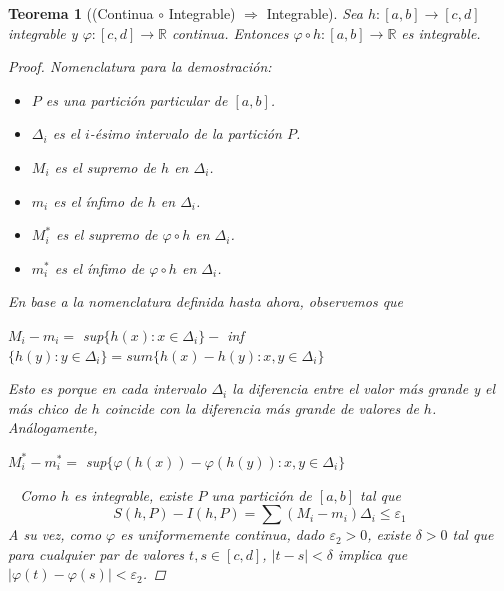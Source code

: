 \documentclass[]{article}
\newtheorem{teo}{Teorema}
\def\R{\mathbb{R}}
\def\e{\varepsilon}
\begin{document}
\begin{teo}[(Continua $\circ$ Integrable) $\Rightarrow$ Integrable]
	Sea $h:[a,b]\to[c,d]$ integrable y $\varphi:[c,d]\to\R$ continua. Entonces $\varphi \circ h:[a,b]\to\R$ es integrable.
	\begin{proof}
		Nomenclatura para la demostración:
		\begin{itemize}
			\item $P$ es una partición particular de $[a,b]$. 
			\item $\Delta_i$ es el $i$-ésimo intervalo de la partición $P$.
			\item $M_i$ es el supremo de $h$ en $\Delta_i$.
			\item $m_i$ es el ínfimo de $h$ en $\Delta_i$.
			\item $M^*_i$ es el supremo de $\varphi \circ h$ en $\Delta_i$.
			\item $m^*_i$ es el ínfimo de $\varphi \circ h$ en $\Delta_i$.
		\end{itemize}
		En base a la nomenclatura definida hasta ahora, observemos que 
		\begin{center}
			$M_i - m_i = $ sup$\{h(x):x\in\Delta_i\}-$ inf$\{h(y):y\in\Delta_i\} = sum\{h(x)-h(y):x,y\in\Delta_i\}$
		\end{center}
		Esto es porque en cada intervalo $\Delta_i$ la diferencia entre el valor más grande y el más chico de $h$ coincide con la diferencia más grande de valores de $h$.
		Análogamente,
		\begin{center}
			$M^*_i-m^*_i = $ sup$\{\varphi(h(x)) - \varphi(h(y)):x,y\in\Delta_i\}$
		\end{center}
		
		~\newline
		Como $h$ es integrable, existe $P$ una partición de $[a,b]$ tal que
		\begin{equation}\label{COSO}
			S(h,P)-I(h,P)=\sum(M_i - m_i)\Delta_i\leq\e_1
		\end{equation}
		A su vez, como $\varphi$ es uniformemente continua, dado $\e_2>0$, existe $\delta>0$ tal que para cualquier par de valores $t,s\in[c,d]$, $|t-s|<\delta$ implica que $|\varphi(t) - \varphi(s)| < \e_2$.
		

\end{proof}
\end{teo}
\end{document}
